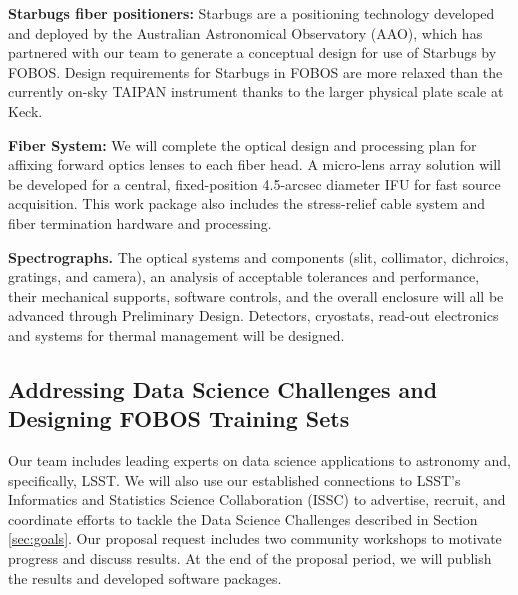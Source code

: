 \documentclass[oneside,11pt]{amsart}
\begin{document}
\noindent \textbf{Starbugs fiber positioners:} Starbugs are a
positioning technology developed and deployed by the Australian
Astronomical Observatory (AAO), which has partnered with our team to
generate a conceptual design for use of Starbugs by FOBOS.  Design
requirements for Starbugs in FOBOS are more relaxed than the currently
on-sky TAIPAN instrument thanks to the larger physical plate scale at
Keck.  

\noindent \textbf{Fiber System:} We will complete the optical design and
processing plan for affixing forward optics lenses to each fiber head.  A
micro-lens array solution will be developed for a central,
fixed-position 4.5-arcsec diameter IFU for fast source acquisition. This
work package also includes the stress-relief cable system and fiber
termination hardware and processing.

\noindent \textbf{Spectrographs.} The optical systems and components
(slit, collimator, dichroics, gratings, and camera), an analysis of
acceptable tolerances and performance, their mechanical supports,
software controls, and the overall enclosure will all be advanced
through Preliminary Design.  Detectors, cryostats, read-out electronics
and systems for thermal management will be designed.



\subsection{Addressing Data Science Challenges and Designing FOBOS Training Sets}
\label{sec:survey}

Our team includes leading experts on data science applications to
astronomy and, specifically, LSST.  We will also use our established
connections to LSST's Informatics and Statistics Science Collaboration
(ISSC) to advertise, recruit, and coordinate efforts to tackle the Data
Science Challenges described in Section \ref{sec:goals}.  Our proposal
request includes two community workshops to motivate progress and discuss
results. At the end of the proposal period, we will publish the results
and developed software packages.
\end{document}
